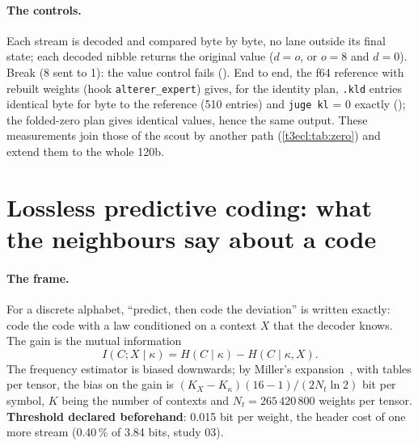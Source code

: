 \paragraph{The controls.} Each stream is decoded and compared byte by byte, no lane outside its final state; each decoded nibble returns the original value ($d = o$, or $o = 8$ and $d = 0$). Break (8 sent to 1): the value control fails (). End to end, the f64 reference with rebuilt weights (hook \texttt{alterer\_expert}) gives, for the identity plan, \texttt{.kld} entries identical byte for byte to the reference (510 entries) and \texttt{juge kl} = 0 exactly (); the folded-zero plan gives identical values, hence the same output. These measurements join those of the scout by another path (\cref{t3ecl:tab:zero}) and extend them to the whole 120b.

\section{Lossless predictive coding: what the neighbours say about a code}\label{t3pre:sec:predictif}

\paragraph{The frame.} For a discrete alphabet, ``predict, then code the deviation'' is written exactly: code the code with a law conditioned on a context $X$ that the decoder knows. The gain is the mutual information
\begin{equation}\label{t3pre:eq:im}
I(C ; X \mid \kappa) = H(C \mid \kappa) - H(C \mid \kappa, X).
\end{equation}
The frequency estimator is biased downwards; by Miller's expansion~\cite{miller1955bias}, with tables per tensor, the bias on the gain is $(K_X - K_\kappa)(16 - 1)/(2 N_t \ln 2)$ bit per symbol, $K$ being the number of contexts and $N_t = 265\,420\,800$ weights per tensor. \textbf{Threshold declared beforehand}: 0.015 bit per weight, the header cost of one more stream (0.40\,\% of 3.84 bits, study 03).


